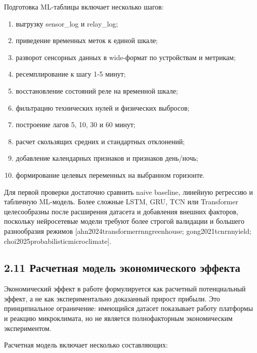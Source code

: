 \documentclass[a4paper,14pt]{extarticle}
\renewcommand{\texttt}[1]{\textnormal{#1}}
\providecommand{\tightlist}{%
  \setlength{\itemsep}{0pt}\setlength{\parskip}{0pt}}
\begin{document}
Подготовка ML-таблицы включает несколько шагов:

\begin{enumerate}
\def\labelenumi{\arabic{enumi})}
\tightlist
\item
  выгрузку \texttt{sensor\_log} и \texttt{relay\_log};
\item
  приведение временных меток к единой шкале;
\item
  разворот сенсорных данных в wide-формат по устройствам и метрикам;
\item
  ресемплирование к шагу 1-5 минут;
\item
  восстановление состояний реле на временной шкале;
\item
  фильтрацию технических нулей и физических выбросов;
\item
  построение лагов 5, 10, 30 и 60 минут;
\item
  расчет скользящих средних и стандартных отклонений;
\item
  добавление календарных признаков и признаков день/ночь;
\item
  формирование целевых переменных на выбранном горизонте.
\end{enumerate}

Для первой проверки достаточно сравнить naive baseline, линейную
регрессию и табличную ML-модель. Более сложные LSTM, GRU, TCN или
Transformer целесообразны после расширения датасета и добавления внешних
факторов, поскольку нейросетевые модели требуют более строгой валидации
и большего разнообразия режимов {[}ahn2024transformerrnngreenhouse;
gong2021tcnrnnyield; choi2025probabilisticmicroclimate{]}.

\subsection{2.11 Расчетная модель экономического
эффекта}\label{ux440ux430ux441ux447ux435ux442ux43dux430ux44f-ux43cux43eux434ux435ux43bux44c-ux44dux43aux43eux43dux43eux43cux438ux447ux435ux441ux43aux43eux433ux43e-ux44dux444ux444ux435ux43aux442ux430}

Экономический эффект в работе формулируется как расчетный потенциальный
эффект, а не как экспериментально доказанный прирост прибыли. Это
принципиальное ограничение: имеющийся датасет показывает работу
платформы и реакцию микроклимата, но не является полнофакторным
экономическим экспериментом.

Расчетная модель включает несколько составляющих:
\end{document}
